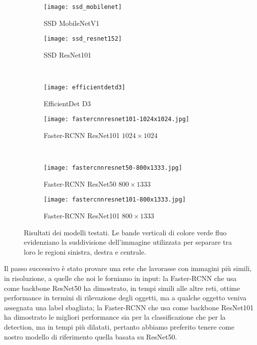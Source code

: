\begin{figure}[t]
    \centering
    \hfill
    \begin{subfigure}[b]{0.49\textwidth}
        \centering
        \texttt{[image: ssd\_mobilenet]}
        \caption{SSD MobileNetV1}
    \end{subfigure}
    \hfill
    \begin{subfigure}[b]{0.49\textwidth}
        \centering
        \texttt{[image: ssd\_resnet152]}
        \caption{SSD ResNet101}
    \end{subfigure}
    \hfill \\
    \hfill
    \begin{subfigure}[b]{0.49\textwidth}
        \centering
        \texttt{[image: efficientdetd3]}
        \caption{EfficientDet D3}
    \end{subfigure}
    \hfill
    \begin{subfigure}[b]{0.49\textwidth}
        \centering
        \texttt{[image: fastercnnresnet101-1024x1024.jpg]}
        \caption{Faster-RCNN ResNet101 $1024\times 1024$}
    \end{subfigure}
    \hfill \\
    \hfill
    \begin{subfigure}[b]{0.49\textwidth}
        \centering
        \texttt{[image: fastercnnresnet50-800x1333.jpg]}
        \caption{Faster-RCNN ResNet50 $800\times 1333$}
    \end{subfigure}
    \hfill
    \begin{subfigure}[b]{0.49\textwidth}
        \centering
        \texttt{[image: fastercnnresnet101-800x1333.jpg]}
        \caption{Faster-RCNN ResNet101 $800\times 1333$}
    \end{subfigure}
    \hfill
    \caption{Risultati dei modelli testati. Le bande verticali di colore verde fluo evidenziano la suddivisione dell’immagine utilizzata per separare tra loro le regioni sinistra, destra e centrale.}
\end{figure}


Il passo successivo è stato provare una rete che lavorasse con immagini più simili, in risoluzione, a quelle che noi le forniamo in input: la Faster-RCNN che usa come backbone ResNet50 ha dimostrato, in tempi simili alle altre reti, ottime performance in termini di rilevazione degli oggetti, ma a qualche oggetto veniva assegnata una label sbagliata; la Faster-RCNN che usa come backbone ResNet101 ha dimostrato le migliori performance sia per la classificazione che per la detection, ma in tempi più dilatati, pertanto abbiamo preferito tenere come nostro modello di riferimento quella basata su ResNet50.

